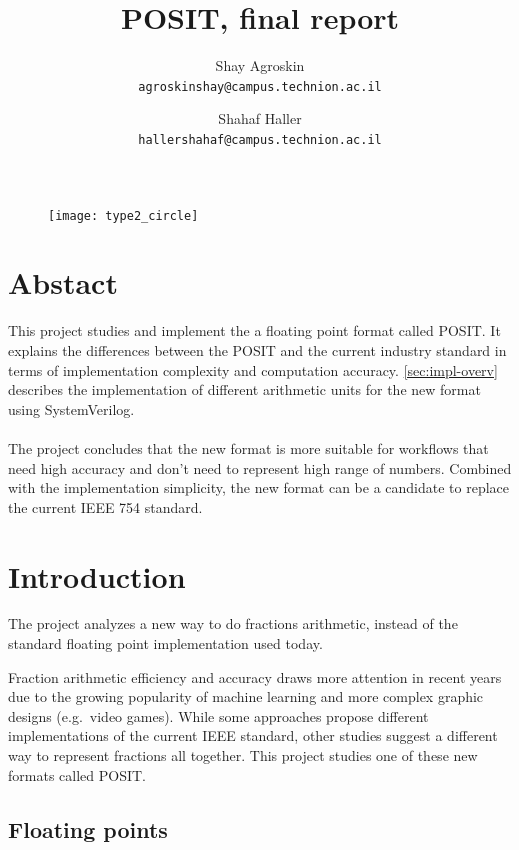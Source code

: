 \documentclass[10pt]{article}
\title{POSIT, final report}
\author{
  Shay Agroskin \\
  \texttt{agroskinshay@campus.technion.ac.il}
  \and
  Shahaf Haller \\
  \texttt{hallershahaf@campus.technion.ac.il}
}
\date{}
\begin{document}
\maketitle
\vspace{3cm}
\begin{figure}[h]\centering
  
  \texttt{[image: type2\_circle]}
\end{figure}
\pagebreak

\tableofcontents

\pagebreak

\section{Abstact}\label{sec:abstact}

This project studies and implement the a floating point format called POSIT. It
explains the differences between the POSIT and the current industry standard in
terms of implementation complexity and computation accuracy.
\autoref{sec:impl-overv} describes the implementation of different arithmetic
units for the new format using SystemVerilog.

\paragraph{}
The project concludes that the new format is more suitable for
workflows that need high accuracy and don't need to represent high range of
numbers. Combined with the implementation simplicity, the new format can be a
candidate to replace the current IEEE 754 standard.

\section{Introduction}\label{sec:introduction}

The project analyzes a new way to do fractions arithmetic, instead of
the standard floating point implementation used today.

Fraction arithmetic efficiency and accuracy draws more attention in recent years
due to the growing popularity of machine learning and more complex graphic
designs (e.g.\ video games). While some approaches propose different
implementations of the current IEEE standard, other studies suggest a different
way to represent fractions all together.
This project studies one of these new formats called POSIT\cite{gustavson}.\@

\subsection{Floating points}\label{sec:floatingpoints}
\end{document}
